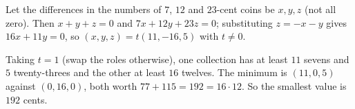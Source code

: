 Let the differences in the numbers of $7$, $12$ and $23$-cent coins be $x,y,z$ (not all zero). Then $x+y+z=0$ and $7x+12y+23z=0$; substituting $z=-x-y$ gives $16x+11y=0$, so $(x,y,z)=t(11,-16,5)$ with $t\ne0$.

Taking $t=1$ (swap the roles otherwise), one collection has at least $11$ sevens and $5$ twenty-threes and the other at least $16$ twelves. The minimum is $(11,0,5)$ against $(0,16,0)$, both worth $77+115=192=16\cdot12$. So the smallest value is $\boxed{192}$ cents.
